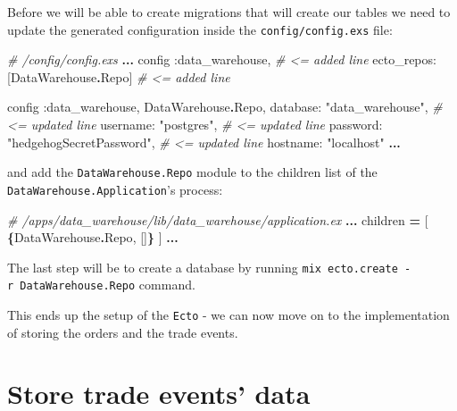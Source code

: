 \documentclass[
  oneside]{book}
\newenvironment{Shaded}{\begin{snugshade}}{\end{snugshade}}
\newcommand{\CommentTok}[1]{\textcolor[rgb]{0.56,0.35,0.01}{\textit{#1}}}
\newcommand{\ConstantTok}[1]{\textcolor[rgb]{0.56,0.35,0.01}{#1}}
\newcommand{\FunctionTok}[1]{\textcolor[rgb]{0.13,0.29,0.53}{\textbf{#1}}}
\newcommand{\NormalTok}[1]{#1}
\newcommand{\OperatorTok}[1]{\textcolor[rgb]{0.81,0.36,0.00}{\textbf{#1}}}
\newcommand{\OtherTok}[1]{\textcolor[rgb]{0.56,0.35,0.01}{#1}}
\newcommand{\StringTok}[1]{\textcolor[rgb]{0.31,0.60,0.02}{#1}}
\newcommand{\VariableTok}[1]{\textcolor[rgb]{0.00,0.00,0.00}{#1}}
\begin{document}
Before we will be able to create migrations that will create our tables we need to update the generated configuration inside the \texttt{config/config.exs} file:

\begin{Shaded}
\begin{Highlighting}[]
\CommentTok{\# /config/config.exs}
\OperatorTok{...}
\NormalTok{config }\VariableTok{:data\_warehouse}\NormalTok{,            }\CommentTok{\# \textless{}= added line}
  \VariableTok{ecto\_repos:} \OtherTok{[}\ConstantTok{DataWarehouse}\OperatorTok{.}\ConstantTok{Repo}\OtherTok{]} \CommentTok{\# \textless{}= added line}

\NormalTok{config }\VariableTok{:data\_warehouse}\NormalTok{, }\ConstantTok{DataWarehouse}\OperatorTok{.}\ConstantTok{Repo}\NormalTok{,}
  \VariableTok{database:} \StringTok{"data\_warehouse"}\NormalTok{,         }\CommentTok{\# \textless{}= updated line}
  \VariableTok{username:} \StringTok{"postgres"}\NormalTok{,               }\CommentTok{\# \textless{}= updated line}
  \VariableTok{password:} \StringTok{"hedgehogSecretPassword"}\NormalTok{, }\CommentTok{\# \textless{}= updated line}
  \VariableTok{hostname:} \StringTok{"localhost"}
\OperatorTok{...}
\end{Highlighting}
\end{Shaded}

and add the \texttt{DataWarehouse.Repo} module to the children list of the \texttt{DataWarehouse.Application}'s process:

\begin{Shaded}
\begin{Highlighting}[]
    \CommentTok{\# /apps/data\_warehouse/lib/data\_warehouse/application.ex}
    \OperatorTok{...}
\NormalTok{    children }\OperatorTok{=} \OtherTok{[}
      \FunctionTok{\{}\ConstantTok{DataWarehouse}\OperatorTok{.}\ConstantTok{Repo}\NormalTok{, }\OtherTok{[]}\FunctionTok{\}}
    \OtherTok{]}
    \OperatorTok{...}
\end{Highlighting}
\end{Shaded}

The last step will be to create a database by running \texttt{mix\ ecto.create\ -r\ DataWarehouse.Repo} command.

This ends up the setup of the \texttt{Ecto} - we can now move on to the implementation of storing the orders and the trade events.

\newpage

\section{Store trade events' data}\label{store-trade-events-data}
\end{document}
